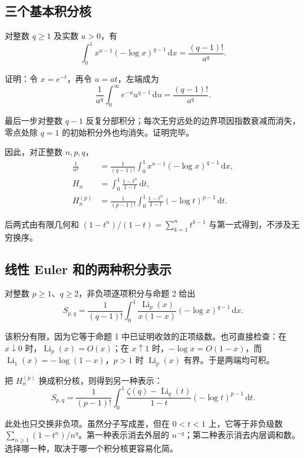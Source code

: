 \documentclass[11pt,a4paper]{article}
\newenvironment{proofblock}{\par\Needspace{4\baselineskip}\noindent}{\par}
\begin{document}
\hypertarget{sec-5-1}{%
\subsection{三个基本积分核}\label{sec-5-1}}

对整数 \(q\geqslant1\) 及实数 \(a>0\)，有
\[
\int_0^1x^{a-1}(-\log x)^{q-1}\,\mathrm dx
=\frac{(q-1)!}{a^q}.
\]

\begin{proofblock}

证明：令 \(x=e^{-t}\)，再令 \(u=at\)，左端成为
\[
\frac1{a^q}\int_0^\infty e^{-u}u^{q-1}\,\mathrm du
=\frac{(q-1)!}{a^q}.
\]

最后一步对整数 \(q-1\) 反复分部积分；每次无穷远处的边界项因指数衰减而消失，零点处除 \(q=1\) 的初始积分外也均消失。证明完毕。

\end{proofblock}

因此，对正整数 \(n,p,q\)，
\[
\begin{aligned}
\frac1{n^q}
&=\frac1{(q-1)!}\int_0^1x^{n-1}(-\log x)^{q-1}\,\mathrm dx,\\
H_n
&=\int_0^1\frac{1-t^n}{1-t}\,\mathrm dt,\\
H_n^{(p)}
&=\frac1{(p-1)!}\int_0^1
\frac{1-t^n}{1-t}(-\log t)^{p-1}\,\mathrm dt.
\end{aligned}
\]

后两式由有限几何和 \((1-t^n)/(1-t)=\sum_{k=1}^{n}t^{k-1}\) 与第一式得到，不涉及无穷换序。

\hypertarget{sec-5-2}{%
\subsection{线性 Euler 和的两种积分表示}\label{sec-5-2}}

对整数 \(p\geqslant1\)、\(q\geqslant2\)，非负项逐项积分与命题 2 给出
\[
S_{p,q}
=\frac1{(q-1)!}\int_0^1
\frac{\operatorname{Li}_p(x)}{x(1-x)}
(-\log x)^{q-1}\,\mathrm dx.
\]

该积分有限，因为它等于命题 1 中已证明收敛的正项级数。也可直接检查：在 \(x\downarrow0\) 时，\(\operatorname{Li}_p(x)=O(x)\)；在 \(x\uparrow1\) 时，\(-\log x=O(1-x)\)，而 \(\operatorname{Li}_1(x)=-\log(1-x)\)，\(p>1\) 时 \(\operatorname{Li}_p(x)\) 有界。于是两端均可积。

把 \(H_n^{(p)}\) 换成积分核，则得到另一种表示：
\[
S_{p,q}
=\frac1{(p-1)!}\int_0^1
\frac{\zeta(q)-\operatorname{Li}_q(t)}{1-t}
(-\log t)^{p-1}\,\mathrm dt.
\]

此处也只交换非负项。虽然分子写成差，但在 \(0<t<1\) 上，它等于非负级数 \(\sum_{n\geqslant1}(1-t^n)/n^q\)。第一种表示消去外层的 \(n^{-q}\)；第二种表示消去内层调和数。选择哪一种，取决于哪一个积分核更容易化简。
\end{document}
